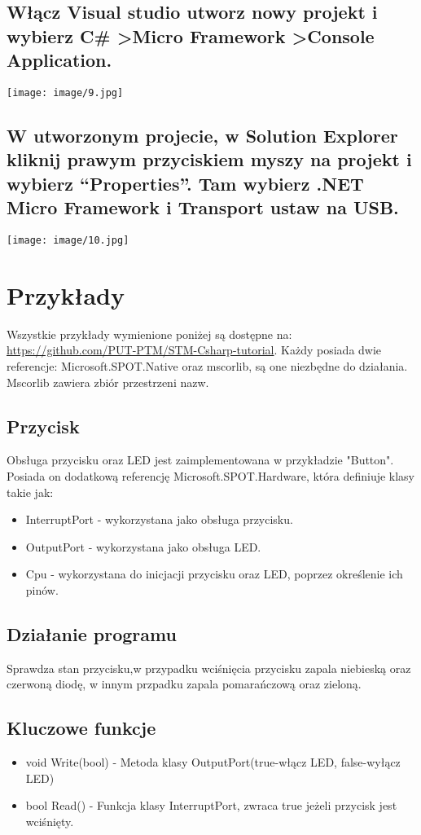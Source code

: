 \documentclass{article}
\begin{document}
\subsection{Włącz Visual studio utworz nowy projekt i wybierz C\# \textgreater Micro Framework \textgreater Console Application.}

\texttt{[image: image/9.jpg]}
\subsection{W utworzonym projecie, w Solution Explorer kliknij prawym przyciskiem myszy na projekt i wybierz “Properties”. Tam wybierz .NET Micro Framework i Transport ustaw na USB.}

\texttt{[image: image/10.jpg]}
\section{Przykłady}
Wszystkie przykłady wymienione poniżej są dostępne na:  \href{https://github.com/PUT-PTM/STM-Csharp-tutorial}{https://github.com/PUT-PTM/STM-Csharp-tutorial}. Każdy posiada dwie referencje: Microsoft.SPOT.Native oraz mscorlib, są one niezbędne do działania. Mscorlib zawiera zbiór przestrzeni nazw.

\subsection{Przycisk}
Obsługa przycisku oraz LED jest zaimplementowana w przykładzie "Button". Posiada on dodatkową referencję Microsoft.SPOT.Hardware, która definiuje klasy takie jak:
\begin{itemize}
\item InterruptPort - wykorzystana jako obsługa przycisku.
\item OutputPort - wykorzystana jako obsługa LED.
\item Cpu - wykorzystana do inicjacji przycisku oraz LED, poprzez określenie ich pinów.
\end{itemize}
\subsection*{Działanie programu}
Sprawdza stan przycisku,w przypadku wciśnięcia przycisku zapala niebieską oraz czerwoną diodę, w innym przpadku zapala pomarańczową oraz zieloną.

\subsection*{Kluczowe funkcje}
\begin{itemize}
\item void Write(bool) - Metoda klasy OutputPort(true-włącz LED, false-wyłącz LED)
\item bool Read() - Funkcja klasy InterruptPort, zwraca true jeżeli przycisk jest wciśnięty.
\end{itemize}
\end{document}
